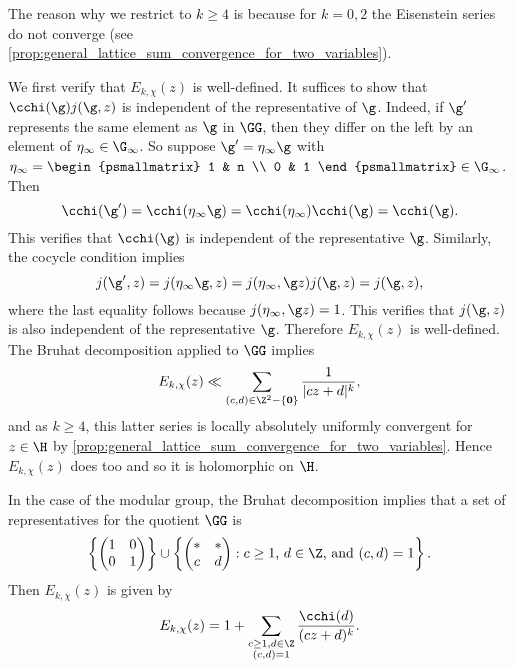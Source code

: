     \begin{remark}
      The reason why we restrict to $k \ge 4$ is because for $k = 0,2$ the Eisenstein series do not converge (see \cref{prop:general_lattice_sum_convergence_for_two_variables}).
    \end{remark}

    We first verify that $E_{k,\chi}(z)$ is well-defined. It suffices to show that $\cchi(\g)j(\g,z)$ is independent of the representative of $\g$. Indeed, if $\g'$ represents the same element as $\g$ in $\GG$, then they differ on the left by an element of $\eta_{\infty} \in \G_{\infty}$. So suppose $\g' = \eta_{\infty}\g$ with $\eta_{\infty} = \begin{psmallmatrix} 1 & n \\ 0 & 1 \end{psmallmatrix} \in \G_{\infty}$. Then
    \[
      \cchi(\g') = \cchi(\eta_{\infty}\g) = \cchi(\eta_{\infty})\cchi(\g) = \cchi(\g).
    \]
    This verifies that $\cchi(\g)$ is independent of the representative $\g$. Similarly, the cocycle condition implies
    \[
      j(\g',z) = j(\eta_{\infty}\g,z) = j(\eta_{\infty},\g z)j(\g,z) = j(\g,z),
    \]
    where the last equality follows because $j(\eta_{\infty},\g z) = 1$. This verifies that $j(\g,z)$ is also independent of the representative $\g$. Therefore $E_{k,\chi}(z)$ is well-defined. The Bruhat decomposition applied to $\GG$ implies
    \[
      E_{k,\chi}(z) \ll \sum_{(c,d) \in \Z^{2}-\{\mathbf{0}\}}\frac{1}{|cz+d|^{k}},
    \]
    and as $k \ge 4$, this latter series is locally absolutely uniformly convergent for $z \in \H$ by \cref{prop:general_lattice_sum_convergence_for_two_variables}. Hence $E_{k,\chi}(z)$ does too and so it is holomorphic on $\H$.

    \begin{remark}\label{rem:Eisenstein_series_on_modular_group}
      In the case of the modular group, the Bruhat decomposition implies that a set of representatives for the quotient $\GG$ is
      \[
        \left\{\begin{pmatrix} 1 & 0 \\ 0 & 1 \end{pmatrix}\right\} \cup \left\{\begin{pmatrix} \ast & \ast \\ c & d \end{pmatrix}:\text{$c \ge 1$, $d \in \Z$, and $(c,d) = 1$}\right\}.
      \]
      Then $E_{k,\chi}(z)$ is given by
      \[
        E_{k,\chi}(z) = 1+\sum_{\substack{c \ge 1, d \in \Z \\ (c,d) = 1}}\frac{\cchi(d)}{(cz+d)^{k}}.
      \]
    \end{remark}

